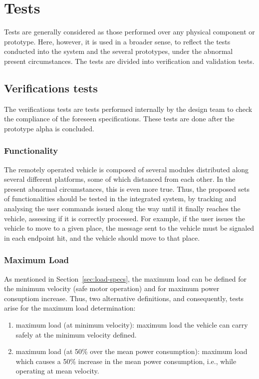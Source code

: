 \section{Tests}%
\label{sec:org3e2776f}
Tests are generally considered as those performed over any physical
component or prototype. Here, however, it is used in a broader sense, to reflect the tests
conducted into the system and the several prototypes, under the abnormal present
circumstances. The tests are divided into verification and validation tests.
\subsection{Verifications tests}%
\label{sec:orge9c79e2}
The verifications tests are tests performed internally by the design team to
check the compliance of the foreseen specifications. These tests are done after
the prototype alpha is concluded.

\subsubsection{Functionality}%
\label{sec:functionality}
The remotely operated vehicle is composed of several modules distributed along
several different platforms, some of which distanced from each other. In the
present abnormal circumstances, this is even more true. Thus, the proposed sets
of functionalities should be tested in the integrated system, by tracking and
analysing the user commands issued along the way until it finally reaches the
vehicle, assessing if it is correctly processed. For example, if the user issues
the vehicle to move to a given place, the message sent to the vehicle must be
signaled in each endpoint hit, and the vehicle should move to that place.

\subsubsection{Maximum Load}%
\label{sec:load}
As mentioned in Section~\ref{sec:load-specs}, the maximum load can be defined
for the minimum velocity (safe motor operation) and for maximum power consuptiom
increase. Thus, two alternative definitions, and consequently, tests arise for the maximum load determination:
\begin{enumerate}
\item maximum load (at minimum velocity): maximum load the vehicle can carry
  safely at the minimum velocity defined.
\item maximum load (at 50\% over the mean power consumption): maximum load which
  causes a 50\% increase in the mean power consumption, i.e., while operating at
  mean velocity.
\end{enumerate}

